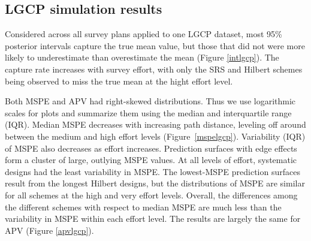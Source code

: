\documentclass[review]{elsarticle}
\begin{document}
\subsection{LGCP simulation results}

Considered across all survey plans applied to one LGCP dataset, most
95\% posterior intervals capture the true mean value, but those that did not
were more likely to underestimate than overestimate the mean (Figure
\ref{intlgcp}). The capture rate increases with survey effort, with only
the SRS and Hilbert schemes being observed to miss the true mean at the
hight effort level.

Both MSPE and APV had right-skewed distributions. Thus we use logarithmic
scales for plots and summarize them using the median and interquartile range
(IQR). Median MSPE decreases with increasing path distance, leveling off
around between the medium and high effort levels (Figure~\ref{mspelgcp}).
Variability (IQR) of MSPE also decreases as effort increases. Prediction
surfaces with edge effects form a cluster of large, outlying MSPE values. At
all levels of effort, systematic designs had the least variability in MSPE.
The lowest-MSPE prediction surfaces result from the longest Hilbert designs,
but the distributions of MSPE are similar for all schemes at the high and very
effort levels. Overall, the differences among the different schemes with
respect to median MSPE are much less than the variability in MSPE within each
effort level. The results are largely the same for APV (Figure \ref{apvlgcp}).



\end{document}
